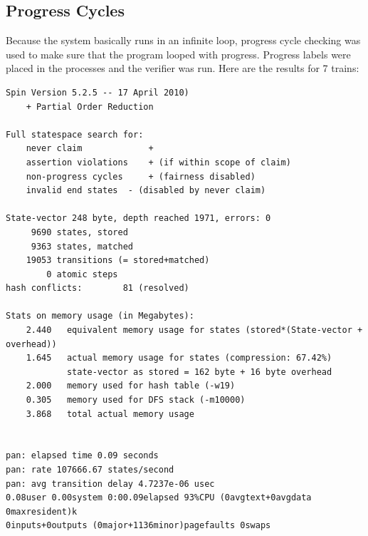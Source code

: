 \documentclass[10pt]{article}
\begin{document}
    \subsection{Progress Cycles}
      Because the system basically runs in an infinite loop, progress cycle
      checking was used to make sure that the program looped with progress.
      Progress labels were placed in the processes and the verifier was run.
      Here are the results for 7 trains:
      \begin{verbatim}
Spin Version 5.2.5 -- 17 April 2010)
	+ Partial Order Reduction

Full statespace search for:
	never claim         	+
	assertion violations	+ (if within scope of claim)
	non-progress cycles 	+ (fairness disabled)
	invalid end states	- (disabled by never claim)

State-vector 248 byte, depth reached 1971, errors: 0
     9690 states, stored
     9363 states, matched
    19053 transitions (= stored+matched)
        0 atomic steps
hash conflicts:        81 (resolved)

Stats on memory usage (in Megabytes):
    2.440	equivalent memory usage for states (stored*(State-vector + overhead))
    1.645	actual memory usage for states (compression: 67.42%)
         	state-vector as stored = 162 byte + 16 byte overhead
    2.000	memory used for hash table (-w19)
    0.305	memory used for DFS stack (-m10000)
    3.868	total actual memory usage


pan: elapsed time 0.09 seconds
pan: rate 107666.67 states/second
pan: avg transition delay 4.7237e-06 usec
0.08user 0.00system 0:00.09elapsed 93%CPU (0avgtext+0avgdata 0maxresident)k
0inputs+0outputs (0major+1136minor)pagefaults 0swaps
      \end{verbatim}  
\end{document}
